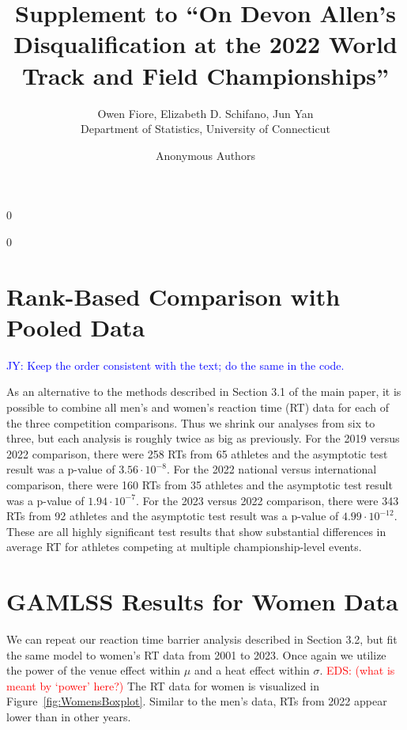 \documentclass[12pt, letterpaper]{article}
\newcommand{\jy}[1]{\textcolor{blue}{JY: #1}}
\newcommand{\eds}[1]{\textcolor{red}{EDS: (#1)}}
\newcommand{\blind}{0}
\begin{document}
\title{\bf Supplement to ``On Devon Allen's Disqualification at the 2022 World Track and Field Championships''}

\blind
{
  \author{Owen Fiore, %
  Elizabeth D. Schifano, %
  Jun Yan\\[1ex]
  Department of Statistics, University of Connecticut\\
}
} \fi

\blind
{
  \bigskip
  \bigskip
  \bigskip
  \author{Anonymous Authors}
  \bigskip
} \fi

\maketitle 

\section{Rank-Based Comparison with Pooled Data}

\jy{Keep the order consistent with the text; do the same in the code.}

As an alternative to the methods described in Section 3.1 of the main paper, it
is possible to combine all men's and women's reaction time (RT) data for each of 
the three competition
comparisons.  Thus we shrink our analyses from six to three, but each analysis
is roughly twice as big as previously.  For the 2019 versus 2022 comparison,
there were 258 RTs from 65 athletes and the asymptotic
test result was a p-value of $3.56 \cdot 10^{-8}$. For the 2022 national versus
international comparison, there were 160 RTs from 35
athletes and the asymptotic test result was a p-value of $1.94 \cdot 10^{-7}$.
For the 2023 versus 2022 comparison, there were 343 RTs
from 92 athletes and the asymptotic test result was a p-value of
$4.99 \cdot 10^{-12}$.  These are all highly significant test results that show
substantial differences in average RT for athletes competing at
multiple championship-level events.


\section{GAMLSS Results for Women Data}

We can repeat our reaction time barrier analysis described in Section 3.2, but
fit the same model to women's RT data from 2001 to 2023.  Once again we utilize
the power of the venue effect within $\mu$ and a heat effect within $\sigma$.
\eds{what is meant by `power' here?} 
The RT data for women is visualized in Figure~\ref{fig:WomensBoxplot}.
Similar to the men's data, RTs from 2022 appear lower than in other
years.
\end{document}
